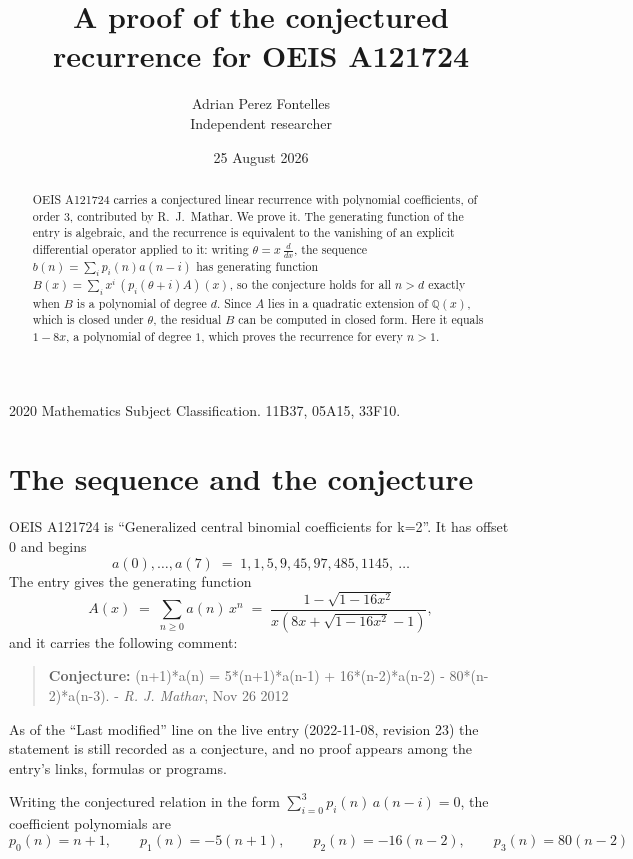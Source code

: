 \documentclass[11pt,a4paper]{article}
\title{A proof of the conjectured recurrence for OEIS A121724}
\author{Adrian Perez Fontelles\\ \small Independent researcher}
\date{25 August 2026}
\theoremstyle{plain}
\theoremstyle{definition}
\begin{document}
\maketitle

\begin{abstract}
OEIS A121724 carries a conjectured linear recurrence with polynomial coefficients, of
order 3, contributed by R.~J.~Mathar. We prove it. The generating function of the
entry is algebraic, and the recurrence is equivalent to the vanishing of an explicit
differential operator applied to it: writing $\theta=x\,\frac{d}{dx}$, the sequence
$b(n)=\sum_{i}p_{i}(n)a(n-i)$ has generating function
$B(x)=\sum_{i}x^{i}\,(p_{i}(\theta+i)A)(x)$, so the conjecture holds for all $n>d$ exactly
when $B$ is a polynomial of degree $d$. Since $A$ lies in a quadratic extension of
$\mathbb{Q}(x)$, which is closed under $\theta$, the residual $B$ can be computed in
closed form. Here it equals $1 - 8 x$, a polynomial of degree $1$, which proves
the recurrence for every $n>1$.
\end{abstract}

\noindent\small 2020 Mathematics Subject Classification. 11B37, 05A15, 33F10.\normalsize

\section{The sequence and the conjecture}

OEIS A121724 is ``Generalized central binomial coefficients for k=2''. It has offset $0$ and begins
\[
a(0),\dots,a(7)\;=\;1, 1, 5, 9, 45, 97, 485, 1145,\ \dots
\]
The entry gives the generating function
\begin{equation}\label{eq:gf}
A(x)\;=\;\sum_{n\ge 0} a(n)\,x^{n}\;=\;\frac{1 - \sqrt{1 - 16 x^{2}}}{x \left(8 x + \sqrt{1 - 16 x^{2}} - 1\right)} ,
\end{equation}
and it carries the following comment:
\begin{quote}\small
\textbf{Conjecture:} (n+1)*a(n) = 5*(n+1)*a(n-1) + 16*(n-2)*a(n-2) - 80*(n-2)*a(n-3). - \emph{R. J. Mathar}, Nov 26 2012
\end{quote}
As of the ``Last modified'' line on the live entry (2022-11-08, revision 23) the
statement is still recorded as a conjecture, and no proof appears among the entry's links,
formulas or programs.

Writing the conjectured relation in the form $\sum_{i=0}^{3}p_{i}(n)\,a(n-i)=0$,
the coefficient polynomials are
\[
p_{0}(n)=n + 1,\qquad p_{1}(n)=- 5 \left(n + 1\right),\qquad p_{2}(n)=- 16 \left(n - 2\right),\qquad p_{3}(n)=80 \left(n - 2\right)
\]
\end{document}
